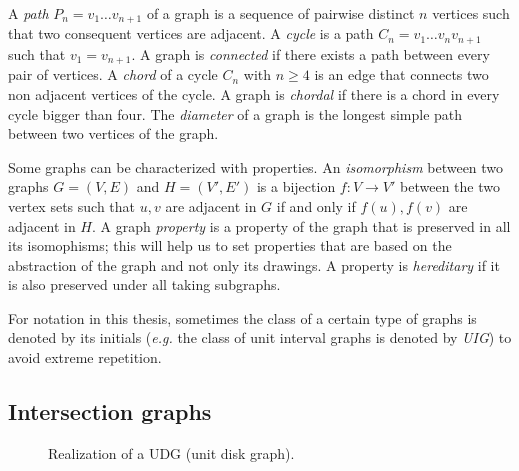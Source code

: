 A \emph{path} $P_n = v_1\dots v_{n+1}$ of a graph is a sequence of pairwise distinct $n$ vertices such that two consequent vertices are adjacent. A \emph{cycle} is a path $C_n = v_1\dots v_nv_{n+1}$ such that $v_1=v_{n+1}$. A graph is \emph{connected} if there exists a path between every pair of vertices. A \emph{chord} of a cycle $C_n$ with $n \geqslant 4$ is an edge that connects two non adjacent vertices of the cycle. A graph is \emph{chordal} if there is a chord in every cycle bigger than four. The \emph{diameter} of a graph is the longest simple path between two vertices of the graph.

Some graphs can be characterized with properties. An \emph{isomorphism} between two graphs $G= (V,E)$ and $H = (V', E')$ is a bijection $f : V \to V'$ between the two vertex sets such that $u,v$ are adjacent in $G$ if and only if $f(u), f(v)$ are adjacent in $H$. A graph \emph{property} is a property of the graph that is preserved in all its isomophisms; this will help us to set properties that are based on the abstraction of the graph and not only its drawings. A property is \emph{hereditary} if it is also preserved under all taking subgraphs.

For notation in this thesis, sometimes the class of a certain type of graphs is denoted by its initials (\textit{e.g.} the class of unit interval graphs is denoted by \emph{UIG}) to avoid extreme repetition.

\subsection{Intersection graphs}

\begin{figure}
\centering

\begin{scaletikzpicturetowidth}{\textwidth}
\end{scaletikzpicturetowidth}

\caption{Realization of a UDG (unit disk graph).}
\label{fig:udg}
\end{figure}


